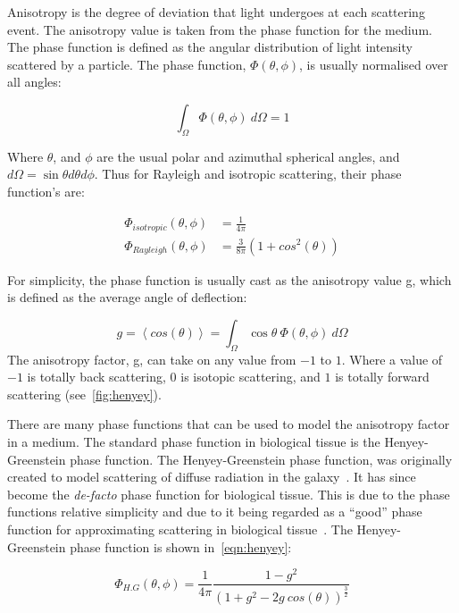 Anisotropy is the degree of deviation that light undergoes at each scattering event. The anisotropy value is taken from the phase function for the medium. The phase function is defined as the angular distribution of light intensity scattered by a particle. The phase function, $\Phi(\theta,\phi)$, is usually normalised over all angles:

\begin{equation}
	\int_{\Omega}\Phi(\theta,\phi)\ d\Omega = 1
\end{equation}

Where $\theta$, and $\phi$ are the usual polar and azimuthal spherical angles, and $d\Omega=\sin\theta d\theta d\phi$.
Thus for Rayleigh and isotropic scattering, their phase function's are:

\begin{align}
	\Phi_{isotropic}(\theta,\phi)&=\frac{1}{4\pi}\\
	\Phi_{Rayleigh}(\theta,\phi)&=\frac{3}{8\pi}(1+cos^2(\theta))
\end{align}

For simplicity, the phase function is usually cast as the anisotropy value g, which is defined as the average angle of deflection:

\begin{equation}
	g=\left<cos(\theta)\right>=\int_{\Omega}\cos\theta\ \Phi(\theta,\phi)\ d\Omega
\end{equation}
The anisotropy factor, g, can take on any value from $-1$ to $1$. Where a value of $-1$ is totally back scattering, $0$ is isotopic scattering, and $1$ is totally forward scattering (see~\cref{fig:henyey}).


There are many phase functions that can be used to model the anisotropy factor in a medium. The standard phase function in biological tissue is the Henyey-Greenstein phase function. The Henyey-Greenstein phase function, was originally created to model scattering of diffuse radiation in the galaxy~\cite{lister2012optical,henyey1941diffuse}. It has since become the \textit{de-facto} phase function for biological tissue. This is due to the phase functions relative simplicity and due to it being regarded as a ``good'' phase function for approximating scattering in biological tissue~\cite{jacques1987angular}.
The Henyey-Greenstein phase function is shown in~\cref{eqn:henyey}:

\begin{equation}
	\Phi_{H.G}(\theta,\phi)=\frac{1}{4\pi}\frac{1-g^2}{(1+g^2-2g\ cos(\theta))^{\tfrac{3}{2}}}
	\label{eqn:henyey}
\end{equation}

